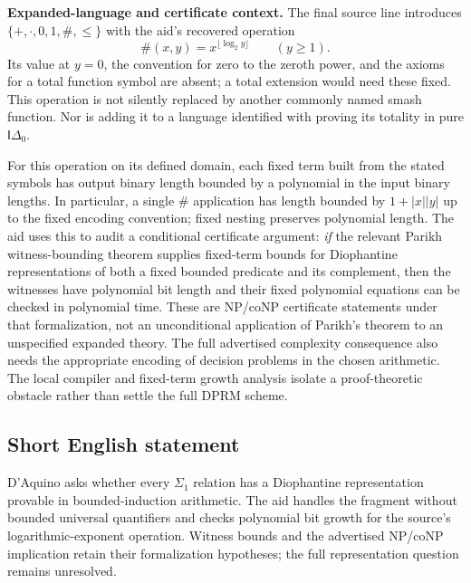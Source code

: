 \documentclass[11pt]{article}
\begin{document}
\textbf{Expanded-language and certificate context.} The final source line introduces $\{+,\cdot,0,1,\#,\le\}$ with the aid's recovered operation
\[
 \#(x,y)=x^{\lfloor\log_2y\rfloor}\qquad(y\ge1).
\]
Its value at $y=0$, the convention for zero to the zeroth power, and the axioms for a total function symbol are absent; a total extension would need these fixed. This operation is not silently replaced by another commonly named smash function. Nor is adding it to a language identified with proving its totality in pure $\mathsf I\Delta_0$.

For this operation on its defined domain, each fixed term built from the stated symbols has output binary length bounded by a polynomial in the input binary lengths. In particular, a single $\#$ application has length bounded by $1+|x||y|$ up to the fixed encoding convention; fixed nesting preserves polynomial length. The aid uses this to audit a conditional certificate argument: \emph{if} the relevant Parikh witness-bounding theorem supplies fixed-term bounds for Diophantine representations of both a fixed bounded predicate and its complement, then the witnesses have polynomial bit length and their fixed polynomial equations can be checked in polynomial time. These are NP/coNP certificate statements under that formalization, not an unconditional application of Parikh's theorem to an unspecified expanded theory. The full advertised complexity consequence also needs the appropriate encoding of decision problems in the chosen arithmetic. The local compiler and fixed-term growth analysis isolate a proof-theoretic obstacle rather than settle the full DPRM scheme.
\subsection{Short English statement}
D'Aquino asks whether every $\Sigma_1$ relation has a Diophantine representation provable in bounded-induction arithmetic. The aid handles the fragment without bounded universal quantifiers and checks polynomial bit growth for the source's logarithmic-exponent operation. Witness bounds and the advertised NP/coNP implication retain their formalization hypotheses; the full representation question remains unresolved.
\end{document}
